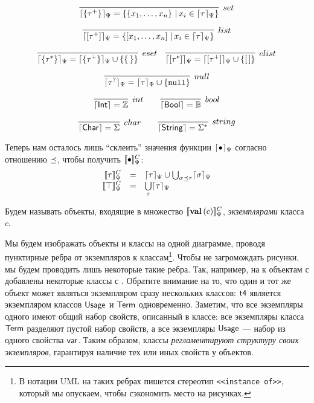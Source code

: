 $$
\infer[set]{
	\semRC{\SetT{\tau^+}} = \left\{ \Set{x_1,\ldots,x_n} \,|\, x_i \in \semRC{\tau}\right\}
}{
}
$$ 

$$
\infer[list]{
	\semRC{\ListT{\tau^+}} = \left\{ \List{x_1,\ldots,x_n} \,|\, x_i \in \semRC{\tau}\right\}
}{
}
$$ 

$$
\infer[eset]{
	\semRC{\SetT{\tau^*}} = \semRC{\SetT{\tau^+}} \cup \left\{ \Set{\,} \right\}
}{
}	
\quad
\infer[elist]{
	\semRC{\ListT{\tau^*}} = \semRC{\ListT{\tau^+}} \cup \left\{ \List{\,} \right\}
}{
}	
$$ 

$$
\infer[null]{
	\semRC{\NullableT{\tau}} = \semRC{\tau} \cup \{\Null\}
}{
}
$$

$$
\infer[int]{
	\sem{\IntegerT} = \mathbb{Z}
}{
}\qquad
\infer[bool]{
	\sem{\BooleanT} = \mathbb{B}
}{
}
$$

$$
\infer[char]{
	\sem{\CharT} = \Sigma
}{
}\qquad
\infer[string]{
	\sem{\StringT} = \Sigma^*
}{
}
$$

Теперь нам осталось лишь ``склеить'' значения функции $\lceil \bullet \rceil_\Psi$ согласно отношению $\preceq$, чтобы получить $[\![\bullet]\!]_\Psi^C$:
$$
\begin{array}{rcl}
	\denotRCC{\tau} &=& \semRC{\tau} \cup \bigcup_{\sigma \subtype \tau} \semRC{\sigma}\\
	\denotRCC{\top} &=& \bigcup\limits_\tau \semRC{\tau}\\
\end{array}	
$$

\begin{Def}
Будем называть объекты, входящие в множество $[\![\mathbf{val}\left(c\right)]\!]_\Psi^C$, \emph{экземплярами} класса $c$.
\end{Def}

Мы будем изображать объекты и классы на одной диаграмме, проводя пунктирные ребра от экземпляров к классам\footnote{В нотации UML на таких ребрах пишется стереотип \texttt{\scriptsize<<instance of>>}, который мы опускаем, чтобы сэкономить место на рисунках.}. Чтобы не загромождать рисунки, мы будем проводить лишь некоторые такие ребра. Так, например, на  к объектам с  добавлены некоторые классы с .
%
%
%
Обратите внимание на то, что один и тот же объект может являться экземпляром сразу нескольких классов: $\mathsf{t4}$ является экземпляром классов $\mathsf{Usage}$ и $\mathsf{Term}$ одновременно. Заметим, что все экземпляры одного имеют общий набор свойств, описанный в классе: все экземпляры класса $\mathsf{Term}$ разделяют пустой набор свойств, а все экземпляры $\mathsf{Usage}$ --- набор из одного свойства $\mathsf{var}$. Таким образом, классы \emph{регламентируют структуру своих экземпляров}, гарантируя наличие тех или иных свойств у объектов.

